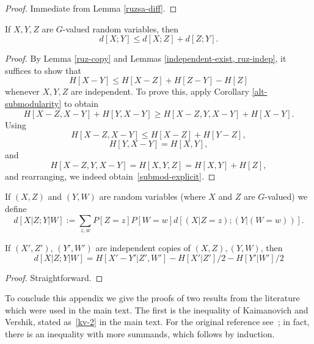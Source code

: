 \begin{proof}  Immediate from Lemma \ref{ruzsa-diff}.
\end{proof}

\begin{lemma}\label{ruzsa-triangle} If $X,Y,Z$ are $G$-valued random variables, then
$$ d[X;Y] \leq d[X;Z] + d[Z;Y].$$
\end{lemma}

\begin{proof} By Lemma \ref{ruz-copy} and Lemmas \ref{independent-exist, ruz-indep}, it suffices to show that
\begin{equation}\label{submod-explicit} H[X - Y] \leq H[X-Z] + H[Z-Y] - H[Z]\end{equation}
whenever $X, Y, Z$ are independent. To prove this, apply Corollary \ref{alt-submodularity} to obtain
\[ H[X - Z, X - Y] + H[Y, X - Y] \geq H[X - Z, Y, X - Y] + H[X - Y].\]
Using
\[ H[X - Z, X - Y] \leq H[X - Z] + H[Y - Z],\]
\[ H[Y, X - Y] = H[X, Y], \] and
\[ H[X - Z, Y, X - Y] = H[X, Y, Z] = H[X, Y] + H[Z],\] and rearranging, we indeed obtain~\eqref{submod-explicit}.
\end{proof}

\begin{definition}\label{cond-dist-def}
If $(X, Z)$ and $(Y, W)$ are random variables (where $X$ and $Z$ are $G$-valued) we define
$$ d[X  | Z; Y | W] := \sum_{z,w} P[Z=z] P[W=w] d[(X|Z=z); (Y|(W=w))].$$
\end{definition}

\begin{lemma}\label{cond-dist-alt}  If $(X',Z')$, $(Y',W')$ are independent copies of $(X,Z), (Y,W)$, then
$$  d[X  | Z;Y | W] = H[X'-Y'|Z',W'] - H[X'|Z']/2 - H[Y'|W']/2$$
\end{lemma}

\begin{proof} Straightforward.
\end{proof}




To conclude this appendix we give the proofs of two results from the literature which were used in the main text. The first is the inequality of Kaimanovich and Vershik, stated as~\eqref{kv-2} in the main text. For the original reference see~\cite[Proposition 1.3]{kv}; in fact, there is an inequality with more summands, which follows by induction.

